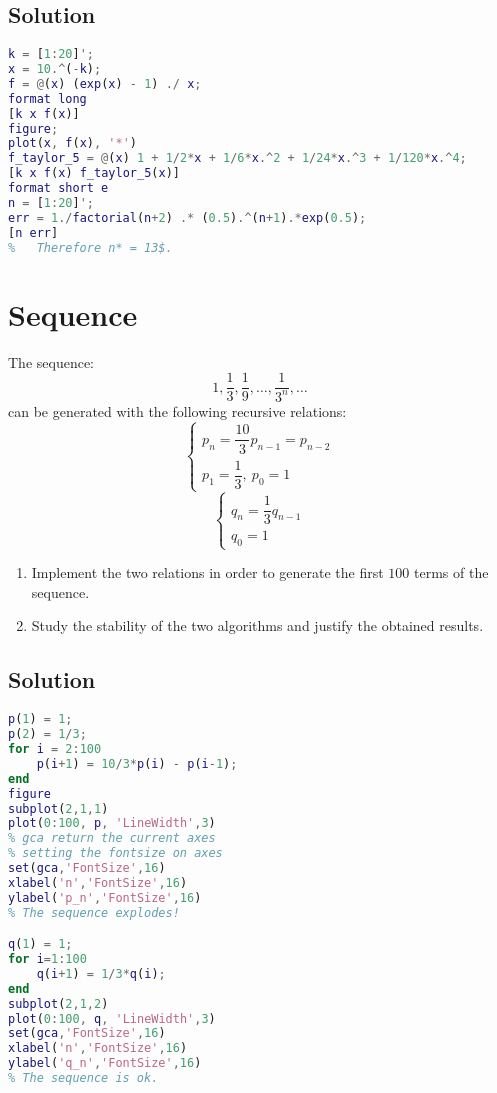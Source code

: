 \documentclass[12pt, a4paper]{report}
\begin{document}
    \subsection*{Solution}
        \begin{lstlisting}[language=Matlab]
%   Evaluate f(x) for values of x around zero (try with xk = 10^{-k}, k in [1,20]). What do you obtain? Explain the results.
k = [1:20]';
x = 10.^(-k);
f = @(x) (exp(x) - 1) ./ x;
format long
[k x f(x)]
figure;
plot(x, f(x), '*')
f_taylor_5 = @(x) 1 + 1/2*x + 1/6*x.^2 + 1/24*x.^3 + 1/120*x.^4;
[k x f(x) f_taylor_5(x)]
format short e
n = [1:20]';
err = 1./factorial(n+2) .* (0.5).^(n+1).*exp(0.5);
[n err]
%   Therefore n* = 13$.            
        \end{lstlisting}

    \newpage

    \section{Sequence}
        The sequence: 
        \[1, \dfrac{1}{3}, \dfrac{1}{9}, \dots, \dfrac{1}{3^n},\dots\]
        can be generated with the following recursive relations: 
        \[
        \begin{cases}
            p_n=\dfrac{10}{3}p_{n-1}=p_{n-2}  \\
            p_1 = \dfrac{1}{3}, \: p_0=1
        \end{cases}
        \]
        \[
        \begin{cases}
            q_n=\dfrac{1}{3}q_{n-1}  \\
            q_0=1
        \end{cases}
        \]
        \begin{enumerate}
            \item Implement the two relations in order to generate the first $100$ terms of the sequence.
            \item Study the stability of the two algorithms and justify the obtained results. 
        \end{enumerate}
    \subsection*{Solution}
        \begin{lstlisting}[language=Matlab]
p(1) = 1;
p(2) = 1/3;
for i = 2:100
    p(i+1) = 10/3*p(i) - p(i-1);
end
figure
subplot(2,1,1)
plot(0:100, p, 'LineWidth',3)
% gca return the current axes 
% setting the fontsize on axes
set(gca,'FontSize',16)
xlabel('n','FontSize',16)
ylabel('p_n','FontSize',16)
% The sequence explodes!

q(1) = 1;
for i=1:100
    q(i+1) = 1/3*q(i);
end
subplot(2,1,2)
plot(0:100, q, 'LineWidth',3)
set(gca,'FontSize',16)
xlabel('n','FontSize',16)
ylabel('q_n','FontSize',16)
% The sequence is ok.
        \end{lstlisting}
\end{document}
